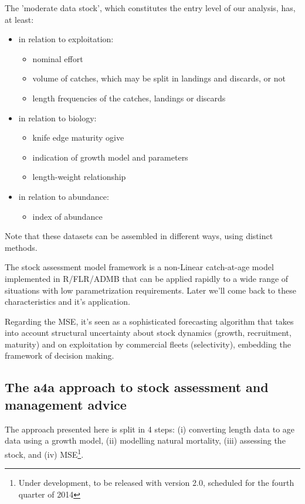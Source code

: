 \documentclass[a4paper,english,10pt]{article}\usepackage[]{graphicx}\usepackage[]{color}
\begin{document}
The 'moderate data stock', which constitutes the entry level of our analysis, has, at least:
\begin{itemize}
	\item in relation to exploitation:
	\begin{itemize}
		\item nominal effort
		\item volume of catches, which may be split in landings and discards, or not
		\item length frequencies of the catches, landings or discards
	\end{itemize}
	\item in relation to biology:
	\begin{itemize}
		\item knife edge maturity ogive
		\item indication of growth model and parameters
		\item length-weight relationship
	\end{itemize}
	\item in relation to abundance:
	\begin{itemize}
		\item index of abundance
	\end{itemize}	
\end{itemize}

Note that these datasets can be assembled in different ways, using distinct methods. 

The stock assessment model framework is a non-Linear catch-at-age model implemented in R/FLR/ADMB that can be applied rapidly to a wide range of situations with low parametrization requirements. Later we'll come back to these characteristics and it's application.

Regarding the MSE, it's seen as a sophisticated forecasting algorithm that takes into account structural uncertainty about stock dynamics (growth, recruitment, maturity) and on exploitation by commercial fleets (selectivity), embedding the framework of decision making. 

\subsection{The a4a approach to stock assessment and management advice}

The approach presented here is split in 4 steps: (i) converting length data to age data using a growth model, (ii) modelling natural mortality, (iii) assessing the stock, and (iv) MSE\footnote{Under development, to be released with version 2.0, scheduled for the fourth quarter of 2014}.
\end{document}
